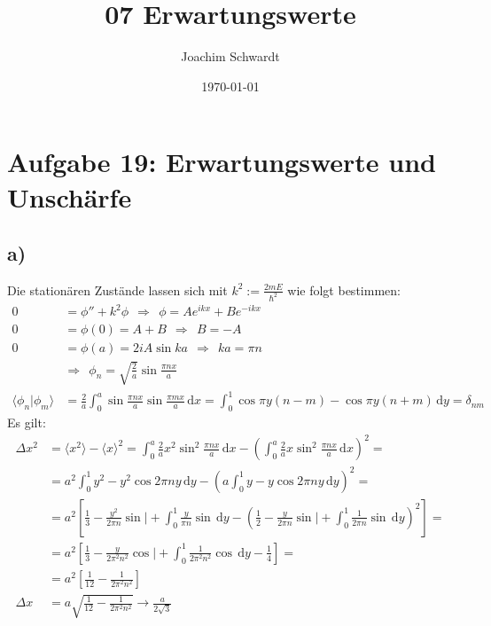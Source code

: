 \documentclass[a4paper,12pt]{article}
\newcommand{\bra}{}
\newcommand{\brak}{}
\newcommand{\intx}{}
\newcommand{\kla}{}
\newcommand{\klam}{}
\begin{document}
\title{07 Erwartungswerte}
\author{Joachim Schwardt}
\date{\today}
\maketitle

\section*{Aufgabe 19: Erwartungswerte und Unschärfe}
\subsection*{a)}
Die stationären Zustände lassen sich mit $k^2:=\frac{2mE}{\hbar^2}$ wie folgt bestimmen:
\begin{align*}
0&=\phi''+k^2\phi\ \ \Rightarrow\ \ \phi=Ae^{ikx}+Be^{-ikx}\\
0&=\phi(0)=A+B\ \ \Rightarrow\ \ B=-A\\
0&=\phi(a)=2iA\sin ka\ \ \Rightarrow\ \ ka=\pi n\\
&\Rightarrow\ \ \phi_n=\sqrt{\frac{2}{a}}\sin\frac{\pi nx}{a} \\
\brak\langle {\phi_n}| {\phi_m}\rangle&=\frac{2}{a}\intx\int_{0}^{a}\sin\frac{\pi nx}{a}\sin\frac{\pi mx}{a}\,\mathrm{d}x=\intx\int_{0}^{1}\cos\pi y(n-m)-\cos\pi y(n+m)\,\mathrm{d}y= \delta_{nm}
\end{align*}
Es gilt:
\begin{align*}
\Delta x^2&=\bra\langle {x^2}\rangle-\bra\langle {x}\rangle^2=\intx\int_{0}^{a}\frac{2}{a}x^2\sin^2\frac{\pi n x}{a}\,\mathrm{d}x-\kla\left( {\int_{0}^{a}\frac{2}{a}x\sin^2\frac{\pi n x}{a}\,\mathrm{d}x} \right)^2= \\
&=a^2\intx\int_{0}^{1}y^2-y^2\cos 2\pi ny\,\mathrm{d}y-\kla\left( {a\intx\int_{0}^{1}y-y\cos 2\pi ny\,\mathrm{d}y} \right)^2=\\
&=a^2\klam\left[ {\frac{1}{3}-\frac{y^2}{2\pi n}\sin\bigg\vert +\intx\int_{0}^{1}\frac{y}{\pi n}\sin \,\mathrm{d}y-\kla\left( {\frac{1}{2}-\frac{y}{2\pi n}\sin\bigg\vert +\intx\int_{0}^{1}\frac{1}{2\pi n}\sin \,\mathrm{d}y} \right)^2} \right]=\\
&=a^2\klam\left[ {\frac{1}{3}-\frac{y}{2\pi^2n^2}\cos\bigg\vert+\intx\int_{0}^{1}\frac{1}{2\pi^2n^2}\cos \,\mathrm{d}y-\frac{1}{4}} \right]=\\
&=a^2\klam\left[ {\frac{1}{12}-\frac{1}{2\pi^2n^2}} \right]\\
\Delta x&=a\sqrt{\frac{1}{12}-\frac{1}{2\pi^2n^2}}\rightarrow \frac{a}{2\sqrt{3}}
\end{align*}
\end{document}
